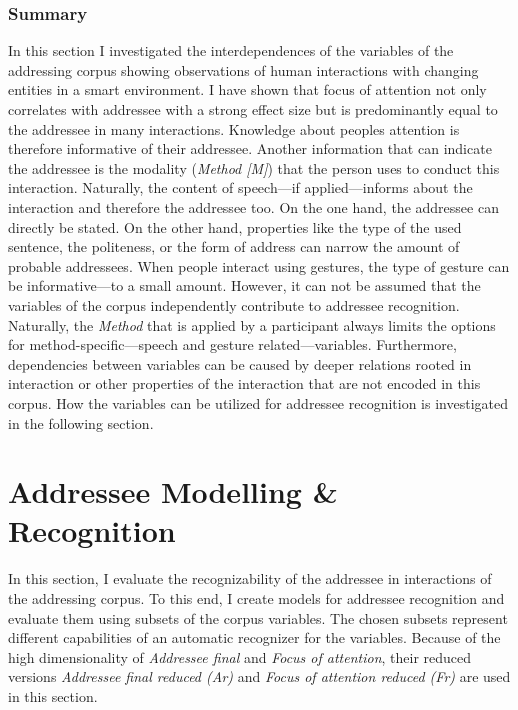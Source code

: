 \subsubsection{Summary}

In this section I investigated the interdependences of the variables of the \gls{addressing corpus} showing observations of human interactions with changing entities in a \gls{smart environment}.
I have shown that focus of attention not only correlates with \gls{addressee} with a strong effect size but is predominantly equal to the \gls{addressee} in many interactions.
Knowledge about peoples attention is therefore informative of their \gls{addressee}.
Another information that can indicate the \gls{addressee} is the modality (\emph{Method [M]}) that the person uses to conduct this interaction.
Naturally, the content of speech---if applied---informs about the interaction and therefore the \gls{addressee} too.
On the one hand, the \gls{addressee} can directly be stated.
On the other hand, properties like the type of the used sentence, the politeness, or the form of address can narrow the amount of probable \glspl{addressee}.
When people interact using gestures, the type of gesture can be informative---to a small amount.
However, it can not be assumed that the variables of the corpus independently contribute to \gls{addressee} recognition.
Naturally, the \emph{Method} that is applied by a participant always limits the options for method-specific---speech and gesture related---variables.
Furthermore, dependencies between variables can be caused by deeper relations rooted in interaction or other properties of the interaction that are not encoded in this corpus.
How the variables can be utilized for \gls{addressee} recognition is investigated in the following section.

\section{Addressee Modelling \& Recognition}\label{sec:addressee-model}

In this section, I evaluate the recognizability of the \gls{addressee} in interactions of the \gls{addressing corpus}.
To this end, I create models for \gls{addressee} recognition and evaluate them using subsets of the corpus variables.
The chosen subsets represent different capabilities of an automatic recognizer for the variables.
Because of the high dimensionality of \emph{Addressee final} and \emph{Focus of attention}, their reduced versions \emph{Addressee final reduced (Ar)} and \emph{Focus of attention reduced (Fr)} are used in this section.

